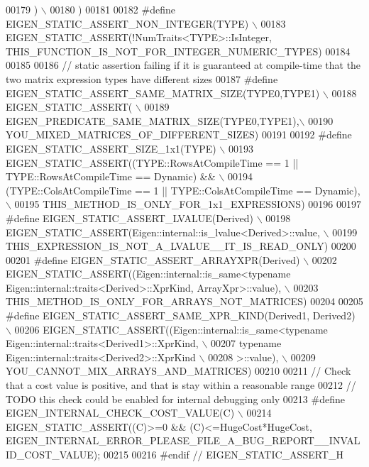 \begin{DoxyCode}
00179 \textcolor{preprocessor}{       ) \(\backslash\)}
00180 \textcolor{preprocessor}{     )}
00181 
00182 \textcolor{preprocessor}{#define EIGEN\_STATIC\_ASSERT\_NON\_INTEGER(TYPE) \(\backslash\)}
00183 \textcolor{preprocessor}{    EIGEN\_STATIC\_ASSERT(!NumTraits<TYPE>::IsInteger, THIS\_FUNCTION\_IS\_NOT\_FOR\_INTEGER\_NUMERIC\_TYPES)}
00184 
00185 
00186 \textcolor{comment}{// static assertion failing if it is guaranteed at compile-time that the two matrix expression types have
       different sizes}
00187 \textcolor{preprocessor}{#define EIGEN\_STATIC\_ASSERT\_SAME\_MATRIX\_SIZE(TYPE0,TYPE1) \(\backslash\)}
00188 \textcolor{preprocessor}{  EIGEN\_STATIC\_ASSERT( \(\backslash\)}
00189 \textcolor{preprocessor}{     EIGEN\_PREDICATE\_SAME\_MATRIX\_SIZE(TYPE0,TYPE1),\(\backslash\)}
00190 \textcolor{preprocessor}{    YOU\_MIXED\_MATRICES\_OF\_DIFFERENT\_SIZES)}
00191 
00192 \textcolor{preprocessor}{#define EIGEN\_STATIC\_ASSERT\_SIZE\_1x1(TYPE) \(\backslash\)}
00193 \textcolor{preprocessor}{      EIGEN\_STATIC\_ASSERT((TYPE::RowsAtCompileTime == 1 || TYPE::RowsAtCompileTime == Dynamic) && \(\backslash\)}
00194 \textcolor{preprocessor}{                          (TYPE::ColsAtCompileTime == 1 || TYPE::ColsAtCompileTime == Dynamic), \(\backslash\)}
00195 \textcolor{preprocessor}{                          THIS\_METHOD\_IS\_ONLY\_FOR\_1x1\_EXPRESSIONS)}
00196 
00197 \textcolor{preprocessor}{#define EIGEN\_STATIC\_ASSERT\_LVALUE(Derived) \(\backslash\)}
00198 \textcolor{preprocessor}{      EIGEN\_STATIC\_ASSERT(Eigen::internal::is\_lvalue<Derived>::value, \(\backslash\)}
00199 \textcolor{preprocessor}{                          THIS\_EXPRESSION\_IS\_NOT\_A\_LVALUE\_\_IT\_IS\_READ\_ONLY)}
00200 
00201 \textcolor{preprocessor}{#define EIGEN\_STATIC\_ASSERT\_ARRAYXPR(Derived) \(\backslash\)}
00202 \textcolor{preprocessor}{      EIGEN\_STATIC\_ASSERT((Eigen::internal::is\_same<typename Eigen::internal::traits<Derived>::XprKind,
       ArrayXpr>::value), \(\backslash\)}
00203 \textcolor{preprocessor}{                          THIS\_METHOD\_IS\_ONLY\_FOR\_ARRAYS\_NOT\_MATRICES)}
00204 
00205 \textcolor{preprocessor}{#define EIGEN\_STATIC\_ASSERT\_SAME\_XPR\_KIND(Derived1, Derived2) \(\backslash\)}
00206 \textcolor{preprocessor}{      EIGEN\_STATIC\_ASSERT((Eigen::internal::is\_same<typename Eigen::internal::traits<Derived1>::XprKind, \(\backslash\)}
00207 \textcolor{preprocessor}{                                             typename Eigen::internal::traits<Derived2>::XprKind \(\backslash\)}
00208 \textcolor{preprocessor}{                                            >::value), \(\backslash\)}
00209 \textcolor{preprocessor}{                          YOU\_CANNOT\_MIX\_ARRAYS\_AND\_MATRICES)}
00210 
00211 \textcolor{comment}{// Check that a cost value is positive, and that is stay within a reasonable range}
00212 \textcolor{comment}{// TODO this check could be enabled for internal debugging only}
00213 \textcolor{preprocessor}{#define EIGEN\_INTERNAL\_CHECK\_COST\_VALUE(C) \(\backslash\)}
00214 \textcolor{preprocessor}{      EIGEN\_STATIC\_ASSERT((C)>=0 && (C)<=HugeCost*HugeCost,
       EIGEN\_INTERNAL\_ERROR\_PLEASE\_FILE\_A\_BUG\_REPORT\_\_INVALID\_COST\_VALUE);}
00215 
00216 \textcolor{preprocessor}{#endif // EIGEN\_STATIC\_ASSERT\_H}
\end{DoxyCode}
